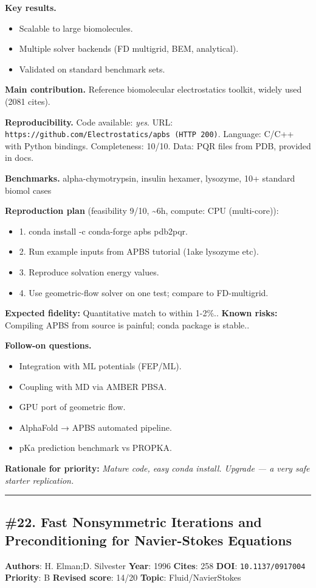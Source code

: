 \documentclass[10pt,letterpaper]{article}
\begin{document}
\textbf{Key results.}
\begin{itemize}
\item Scalable to large biomolecules.
\item Multiple solver backends (FD multigrid, BEM, analytical).
\item Validated on standard benchmark sets.
\end{itemize}

\textbf{Main contribution.} Reference biomolecular electrostatics toolkit, widely used (2081 cites).

\textbf{Reproducibility.} Code available: \emph{yes}. URL: \texttt{https://github.com/Electrostatics/apbs (HTTP 200)}. Language: C/C++ with Python bindings. Completeness: 10/10. Data: PQR files from PDB, provided in docs.

\textbf{Benchmarks.} alpha-chymotrypsin, insulin hexamer, lysozyme, 10+ standard biomol cases

\textbf{Reproduction plan} (feasibility 9/10, \textasciitilde6h, compute: CPU (multi-core)):
\begin{itemize}
\item 1. conda install -c conda-forge apbs pdb2pqr.
\item 2. Run example inputs from APBS tutorial (1ake lysozyme etc).
\item 3. Reproduce solvation energy values.
\item 4. Use geometric-flow solver on one test; compare to FD-multigrid.
\end{itemize}
\textbf{Expected fidelity:} Quantitative match to within 1-2\%.. \textbf{Known risks:} Compiling APBS from source is painful; conda package is stable..

\textbf{Follow-on questions.}
\begin{itemize}
\item Integration with ML potentials (FEP/ML).
\item Coupling with MD via AMBER PBSA.
\item GPU port of geometric flow.
\item AlphaFold → APBS automated pipeline.
\item pKa prediction benchmark vs PROPKA.
\end{itemize}

\textbf{Rationale for priority:} \emph{Mature code, easy conda install. Upgrade — a very safe starter replication.}

\medskip\hrule\medskip

\subsection*{\#22. Fast Nonsymmetric Iterations and Preconditioning for Navier-Stokes Equations}
\textbf{Authors}: H. Elman;D. Silvester \textbullet{} \textbf{Year}: 1996 \textbullet{} \textbf{Cites}: 258 \textbullet{} \textbf{DOI}: \texttt{10.1137/0917004} \\
\textbf{Priority}: B \textbullet{} \textbf{Revised score}: 14/20 \textbullet{} \textbf{Topic}: Fluid/NavierStokes
\end{document}
